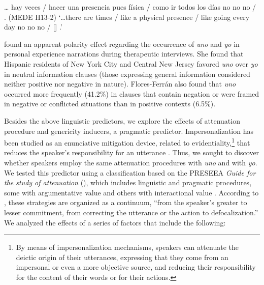 \documentclass[output=paper]{langscibook}
\begin{document}
\eanoraggedright\label{ex:orozco:5}
{… hay veces}     {/} \ExHighlight{[∅]}   hacer una presencia pues física / como ir todos los días no no no / \ExHighlight{[∅]}  . (MEDE H13{}-2)
\glt ‘…there are times    / \ExHighlight{[I]}   like a physical presence / like going every day no no no / [] .'
\z 

\citet[1817]{Flores-Ferrán2009} found an apparent polarity effect regarding the occurrence of \textit{uno} and \textit{yo} in personal experience narrations during therapeutic interviews. She found that Hispanic residents of New York City and Central New Jersey favored \textit{uno} over \textit{yo} in neutral information clauses (those expressing general information considered neither positive nor negative in nature). Flores-Ferrán also found that \textit{uno} occurred more frequently (41.2\%) in clauses that contain negation or were framed in negative or conflicted situations than in positive contexts (6.5\%).  

\label{sec:orozco:3.3.1.4}

Besides the above linguistic predictors, we explore the effects of attenuation procedure and genericity inducers, a pragmatic predictor. Impersonalization has been studied as an enunciative mitigation device, related to evidentiality,\footnote{By means of impersonalization mechanisms, speakers can attenuate the deictic origin of their utterances, expressing that they come from an impersonal or even a more objective source, and reducing their responsibility for the content of their words or for their actions.} that reduces the speaker’s responsibility for an utterance \citep{Caffi2007}. Thus, we sought to discover whether speakers employ the same attenuation procedures with \textit{uno} and with \textit{yo}. We tested this predictor using a classification based on the PRESEEA \textit{Guide for the study of attenuation} (\citealt{CesteroAlfano2021}), which includes linguistic and pragmatic procedures, some with argumentative value and others with interactional value \citep{BrizGómez1995}. According to \citet[367]{CesteroMancera2020}, these strategies are organized as a continuum, “from the speaker’s greater to lesser commitment, from correcting the utterance or the action to defocalization.” We analyzed the effects of a series of factors that include the following: 
\end{document}
